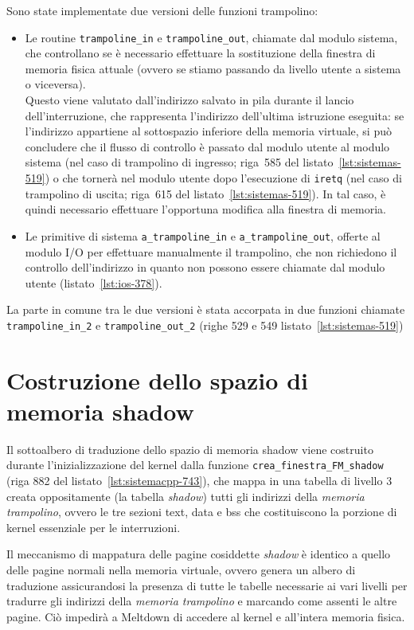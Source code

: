 Sono state implementate due versioni delle funzioni trampolino: 
\begin{itemize}
	\item Le routine \texttt{trampoline\_in} e \texttt{trampoline\_out}, chiamate dal modulo sistema, che controllano se è necessario effettuare la sostituzione della finestra di memoria fisica attuale (ovvero se stiamo passando da livello utente a sistema o viceversa).\\
	Questo viene valutato dall'indirizzo salvato in pila durante il lancio dell'interruzione, che rappresenta l'indirizzo dell'ultima istruzione eseguita: se l'indirizzo appartiene al sottospazio inferiore della memoria virtuale, si può concludere che il flusso di controllo è passato dal modulo utente al modulo sistema (nel caso di trampolino di ingresso; riga~585 del listato~\vref{lst:sistemas-519}) o che tornerà nel modulo utente dopo l'esecuzione di \texttt{iretq} (nel caso di trampolino di uscita; riga~615 del listato~\vref{lst:sistemas-519}).
	In tal caso, è quindi necessario effettuare l'opportuna modifica alla finestra di memoria.\\
	
	\item Le primitive di sistema \texttt{a\_trampoline\_in} e \texttt{a\_trampoline\_out}, offerte al modulo I/O per effettuare manualmente il trampolino, che non richiedono il controllo dell'indirizzo in quanto non possono essere chiamate dal modulo utente (listato~\vref{lst:ios-378}).
\end{itemize}

La parte in comune tra le due versioni è stata accorpata in due funzioni chiamate \texttt{trampoline\_in\_2} e \texttt{trampoline\_out\_2} (righe 529 e 549 listato~\vref{lst:sistemas-519})

\section{Costruzione dello spazio di memoria shadow}
\label{sec:memoria-shadow}
Il sottoalbero di traduzione dello spazio di memoria shadow viene costruito durante l'inizializzazione del kernel dalla funzione \texttt{crea\_finestra\_FM\_shadow} (riga 882 del listato~\vref{lst:sistemacpp-743}), che mappa in una tabella di livello 3 creata oppositamente (la tabella \emph{shadow}) tutti gli indirizzi della \emph{memoria trampolino}, ovvero le tre sezioni text, data e bss che costituiscono la porzione di kernel essenziale per le interruzioni.

Il meccanismo di mappatura delle pagine cosiddette \emph{shadow} è identico a quello delle pagine normali nella memoria virtuale, ovvero genera un albero di traduzione assicurandosi la presenza di tutte le tabelle necessarie ai vari livelli per tradurre gli indirizzi della \emph{memoria trampolino} e marcando come assenti le altre pagine.
Ciò impedirà a Meltdown di accedere al kernel e all'intera memoria fisica.

